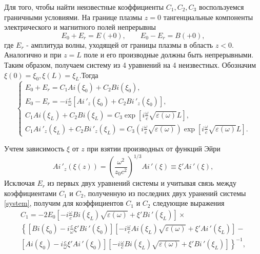 \documentclass[12pt,a4paper]{article}
\numberwithin{equation}{section}
\begin{document}
Для того, чтобы найти неизвестные коэффициенты $C_1, C_2, C_3$ воспользуемся граничными условиями. На границе плазмы $z=0$ тангенциальные компоненты электрического и магнитного полей непрерывны 
\begin{equation}
\label{bound}
    E_0+E_r=E(+0), \qquad  E_0-E_r=B(+0),
\end{equation}
где $E_r$ - амплитуда волны, уходящей от границы плазмы в область $z<0$. Аналогично и при $z=L$ поле и его производные должны быть непрерывными. Таким образом, получаем систему из 4 уравнений на 4 неизвестных.  Обозначим $\xi\left(0\right) = \xi_0, \xi\left(L\right) = \xi_L$.Тогда
\begin{equation}
    \label{system}
    \begin{cases}
    E_0+E_r = C_1 Ai\left(\xi_0\right)+C_2 Bi\left(\xi_0\right), \\
    E_0-E_r=-i\frac{c}{\omega}\left[Ai\,'_z\left(\xi_0\right)+C_2 Bi\,'_z\left(\xi_0\right)\right],\\
    C_1 Ai\left(\xi_L\right)+C_2 Bi\left(\xi_L\right)=C_3\exp\left[i\frac{\omega}{c}\sqrt{\varepsilon\left(\omega\right)} L\right], \\
    C_1 Ai\,'_z\left(\xi_L\right)+C_2 Bi\,'_z\left(\xi_L\right)=  C_3\left(i\frac{\omega}{c}\sqrt{\varepsilon\left(\omega\right)}\right)\exp\left[i\frac{\omega}{c}\sqrt{\varepsilon\left(\omega\right)} L\right].
    
    \end{cases}
\end{equation}

Учтем зависимость $\xi$ от $z$ при взятии производных от функций Эйри
\begin{equation}
    Ai\,'_z\left(\xi\left(z\right)\right) = \left(\frac{\omega^2}{z_0 c^2}\right)^{1/3}Ai\,'\left(\xi\right) \equiv \xi' Ai\,'\left(\xi\right),
\end{equation}
Исключая $E_r$ из первых двух уравнений системы и учитывая связь между коэффициентами $C_1$ и $C_2$, полученную из последних двух уранений системы \eqref{system}, получим для коэффициентов $C_1$ и $C_2$ следующие выражения
\begin{equation}
    \label{C1_common}
    \begin{array}{lcl}
         C_1 = -2E_0\left[-i\frac{\omega}{c}Bi\left(\xi_L\right)\sqrt{\varepsilon\left(\omega\right)}+\xi'Bi\,'\left(\xi_L\right)\right]\times \\
       \left\{\left[Bi\left(\xi_0\right)-i\frac{c}{\omega}\xi'Bi\,'\left(\xi_0\right)\right]\left[-i\frac{\omega}{c}Ai\left(\xi_L\right)\sqrt{\varepsilon\left(\omega\right)}+\xi'Ai\,'\left(\xi_L\right)\right] - \right.\\ 
       \left.\left[Ai\left(\xi_0\right)-i\frac{c}{\omega}\xi'Ai\,'\left(\xi_0\right)\right]\left[-i\frac{\omega}{c}Bi\left(\xi_L\right)\sqrt{\varepsilon\left(\omega\right)}+\xi'Bi\,'\left(\xi_L\right)\right]\right\}^{-1},
    \end{array}
\end{equation}
\end{document}

